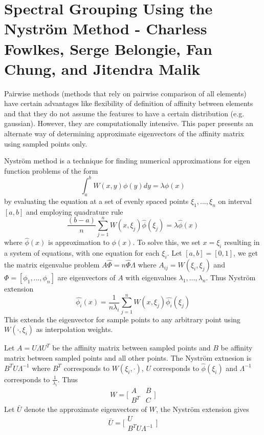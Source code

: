 \documentclass[10pt,a4paper,twoside]{report}
\theoremstyle{definition}
\begin{document}
	
	\chapter*{Spectral Grouping Using the Nystr\"{o}m Method - Charless Fowlkes, Serge Belongie, Fan Chung, and Jitendra Malik}
	Pairwise methods (methods that rely on pairwise comparison of all elements) have certain advantages like flexibility of definition of affinity between elements and that they do not assume the features to have a certain distribution (e.g. gaussian). However, they are computationally intensive. This paper presents an alternate way of determining approximate eigenvectors of the affinity matrix using sampled points only.
	
	Nystr\"{o}m method is a technique for finding numerical approximations for eigen function problems of the form $$\int_{a}^{b}W(x,y)\phi(y)d{y} = \lambda\phi(x)$$ by evaluating the equation at a set of evenly spaced points $\xi_1,\ldots,\xi_n$ on interval $[a,b]$ and employing quadrature rule $$\frac{(b-a)}{n}\sum_{j=1}^{n}W(x, \xi_j)\hat{\phi}(\xi_j) = \lambda\hat{\phi}(x)$$ where $\hat{\phi}(x)$ is approximation to $\phi(x)$. To solve this, we set $x = \xi_i$ resulting in a system of equations, with one equation for each $\xi_i$.  Let $[a,b] = [0,1]$, we get the matrix eigenvalue problem $A\hat{\Phi} = n\hat{\Phi}\Lambda$ where $A_{ij} = W(\xi_i,\xi_j)$ and $\Phi = [\phi_1,\ldots,\phi_n]$ are eigenvectors of $A$ with eigenvalues $\lambda_1,\ldots,\lambda_n$. Thus Nystr\"{o}m extension $$\hat{\phi_i}(x) = \frac{1}{n\lambda_i}\sum_{j=1}^{n}W(x,\xi_j)\hat{\phi_i}(\xi_j)$$ This extends the eigenvector for sample points to any arbitrary point using $W(\cdot, \xi_i)$ as interpolation weights.
	
	Let $A=U\Lambda U^T$ be the affinity matrix between sampled points and $B$ be affinity matrix between sampled points and all other points. The Nystr\"{o}m extnesion is $B^TU\Lambda^{-1}$ where $B^T$ corresponds to $W(\xi_i, \cdot)$, $U$ corresponds to $\hat{\phi}(\xi_i)$ and $\Lambda^{-1}$ corresponds to $\frac{1}{\lambda_i}$. Thus $$W = \bigg[\begin{matrix}A & B \\B^T & C\end{matrix}\bigg]$$ Let $\bar{U}$ denote the approximate eigenvectors of $W$, the Nystr\"{o}m extension gives $$\bar{U}=\bigg[\begin{matrix} U\\B^TU\Lambda^{-1} \end{matrix}\bigg]$$
	
\end{document}

